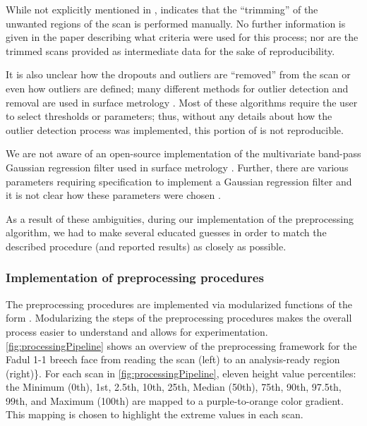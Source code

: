 While not explicitly mentioned in \citet{song_3d_2014},
\citet{song_estimating_2018} indicates that the ``trimming'' of the
unwanted regions of the scan is performed manually. No further
information is given in the paper describing what criteria were used for
this process; nor are the trimmed scans provided as intermediate data
for the sake of reproducibility.

It is also unclear how the dropouts and outliers are ``removed'' from
the scan or even how outliers are defined; many different methods for
outlier detection and removal are used in surface metrology
\citep{outlierdetection}. Most of these algorithms require the user to
select thresholds or parameters; thus, without any details about how the
outlier detection process was implemented, this portion of
\citet{song_3d_2014} is not reproducible.

We are not aware of an open-source implementation of the multivariate
band-pass Gaussian regression filter used in surface metrology
\citep{ISO16610-71}. Further, there are various parameters requiring
specification to implement a Gaussian regression filter and it is not
clear how these parameters were chosen
\citep{brinkman_bodschwinna_2003}.

As a result of these ambiguities, during our implementation of the
preprocessing algorithm, we had to make several educated guesses in
order to match the described procedure (and reported results) as closely
as possible.

\hypertarget{implementation-of-preprocessing-procedures}{%
\subsubsection{Implementation of preprocessing
procedures}\label{implementation-of-preprocessing-procedures}}

The preprocessing procedures are implemented via modularized functions
of the form . Modularizing the steps of the
preprocessing procedures makes the overall process easier to understand
and allows for experimentation. \autoref{fig:processingPipeline} shows
an overview of the preprocessing framework for the Fadul 1-1 breech face
from reading the scan (left) to an analysis-ready region (right)\}. For
each scan in \autoref{fig:processingPipeline}, eleven height value
percentiles: the Minimum (0th), 1st, 2.5th, 10th, 25th, Median (50th),
75th, 90th, 97.5th, 99th, and Maximum (100th) are mapped to a
purple-to-orange color gradient. This mapping is chosen to highlight the
extreme values in each scan.

